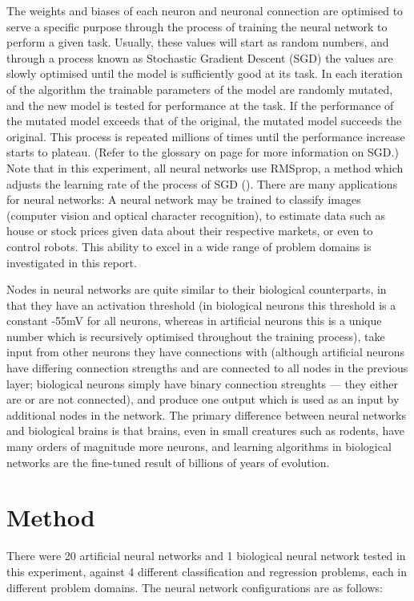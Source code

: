 \documentclass[]{report}
\begin{document}
The weights and biases of each neuron and neuronal connection are optimised to serve a specific purpose through the process of training the neural network to perform a given task. Usually, these values will start as random numbers, and through a process known as Stochastic Gradient Descent (SGD) the values are slowly optimised until the model is sufficiently good at its task. In each iteration of the algorithm the trainable parameters of the model are randomly mutated, and the new model is tested for performance at the task. If the performance of the mutated model exceeds that of the original, the mutated model succeeds the original. This process is repeated millions of times until the performance increase starts to plateau. (Refer to the glossary on page \pageref{itm:SGD} for more information on SGD.) Note that in this experiment, all neural networks use RMSprop, a method which adjusts the learning rate of the process of SGD (\cite{hinton2012neural}). There are many applications for neural networks: A neural network may be trained to classify images (computer vision and optical character recognition), to estimate data such as house or stock prices given data about their respective markets, or even to control robots. This ability to excel in a wide range of problem domains is investigated in this report.

Nodes in neural networks are quite similar to their biological counterparts, in that they have an activation threshold (in biological neurons this threshold is a constant -55mV for all neurons, whereas in artificial neurons this is a unique number which is recursively optimised throughout the training process), take input from other neurons they have connections with (although artificial neurons have differing connection strengths and are connected to all nodes in the previous layer; biological neurons simply have binary connection strenghts --- they either are or are not connected), and produce one output which is used as an input by additional nodes in the network. The primary difference between neural networks and biological brains is that brains, even in small creatures such as rodents, have many orders of magnitude more neurons, and learning algorithms in biological networks are the fine-tuned result of billions of years of evolution.

\label{itm:Method}
\section{Method}

There were 20 artificial neural networks and 1 biological neural network tested in this experiment, against 4 different classification and regression problems, each in different problem domains. The neural network configurations are as follows:
\end{document}
